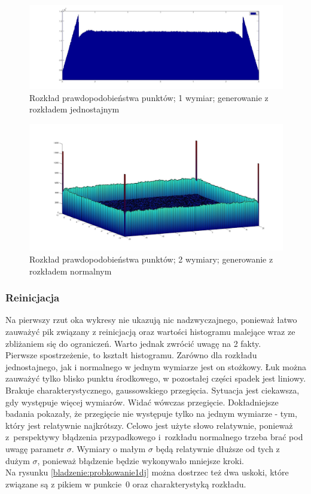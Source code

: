 \documentclass{mini}
\begin{document}
\begin{figure}[H]
\centering
\includegraphics[width=\textwidth]{p_j_100M_1__3_3}
\caption{Rozkład prawdopodobieństwa punktów; 1 wymiar; generowanie z rozkładem jednostajnym}
\label{bladzenie:rzutowanie1dj}
\end{figure}

\begin{figure}[H]
\centering
\includegraphics[width=\textwidth]{p_n_10M_2__20_20__10_10_4_2}
\caption{Rozkład prawdopodobieństwa punktów; 2 wymiary; generowanie z rozkładem normalnym}
\label{bladzenie:rzutowanie2d}
\end{figure}

\subsubsection*{Reinicjacja}
Na pierwszy rzut oka wykresy nie ukazują nic nadzwyczajnego, ponieważ łatwo zauważyć pik związany z reinicjacją oraz wartości histogramu malejące wraz ze zbliżaniem się do ograniczeń. Warto jednak zwrócić uwagę na 2 fakty.\\
Pierwsze spostrzeżenie, to kształt histogramu. Zarówno dla rozkładu jednostajnego, jak i normalnego w jednym wymiarze jest on stożkowy. Łuk można zauważyć tylko blisko punktu środkowego, w pozostałej części spadek jest liniowy. Brakuje charakterystycznego, gaussowskiego przegięcia. Sytuacja jest ciekawsza, gdy występuje więcej wymiarów. Widać wówczas przegięcie. Dokładniejsze badania pokazały, że przegięcie nie występuje tylko na jednym wymiarze - tym, który jest relatywnie najkrótszy. Celowo jest użyte słowo relatywnie, ponieważ z~perspektywy błądzenia przypadkowego i~rozkładu normalnego trzeba brać pod uwagę parametr $\sigma$. Wymiary o małym $\sigma$ będą relatywnie dłuższe od tych z dużym $\sigma$, ponieważ błądzenie będzie wykonywało mniejsze kroki.\\
Na rysunku \ref{bladzenie:probkowanie1dj} można dostrzec też dwa uskoki, które związane są z pikiem w punkcie~$0$ oraz charakterystyką rozkładu.
\end{document}
